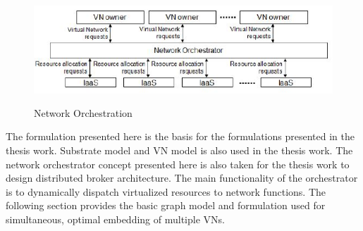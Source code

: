 \documentclass[article,dr=phil,type=msc ,colorback,accentcolor=tud4b]{tudthesis}
\begin{document}
\begin{figure}[h]
	\centering
	\includegraphics[width=14cm, height=4cm]{sdn_orc.jpg}
	\caption{Network Orchestration}
	\label{fig: Network Orchestration}
\end{figure}


The formulation presented here is the basis for the formulations presented in the thesis work. Substrate model and VN model is also used in the thesis work. The network orchestrator concept presented here is also taken for the thesis work to design distributed broker architecture. The main functionality of the orchestrator is to dynamically dispatch virtualized resources to network functions. The following section provides the basic graph model and formulation used for simultaneous, optimal embedding of multiple VNs. 
\end{document}
